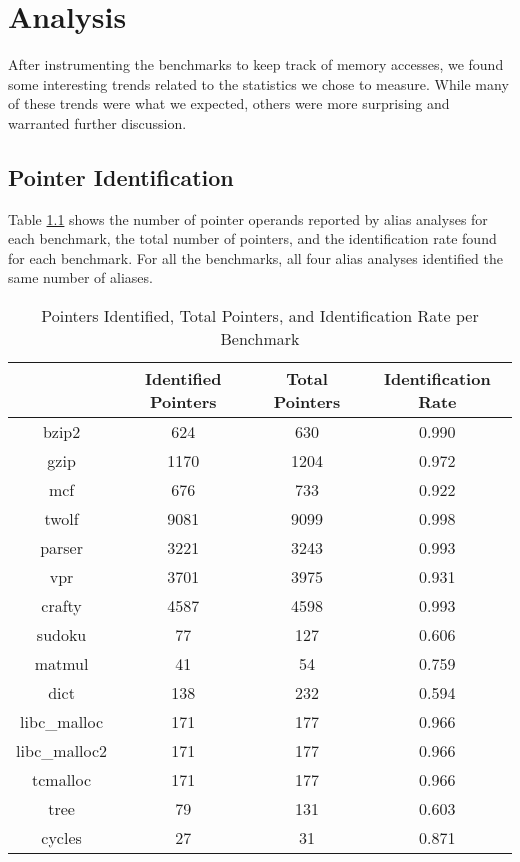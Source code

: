 \chapter{Analysis}

After instrumenting the benchmarks to keep track of memory accesses, we found some interesting trends related to the statistics we chose to measure. While many of these trends were what we expected, others were more surprising and warranted further discussion.

\section{Pointer Identification}
Table \ref{table:1} shows the number of pointer operands reported by alias analyses for each benchmark, the total number of pointers, and the identification rate found for each benchmark. For all the benchmarks, all four alias analyses identified the same number of aliases.

\begin{table} [h!]
\centering
   \begin{tabular} {|c|c c c|}
      \hline
	   & Identified Pointers & Total Pointers & Identification Rate \\
      \hline
	   bzip2 & 624 & 630 & 0.990 \\
      \hline
	   gzip & 1170 & 1204 & 0.972 \\
      \hline
	   mcf & 676 & 733 & 0.922 \\
      \hline
	   twolf & 9081 & 9099 & 0.998 \\
      \hline
	   parser & 3221 & 3243 & 0.993 \\
      \hline
	   vpr & 3701 & 3975 & 0.931 \\
      \hline
	   crafty & 4587 & 4598 & 0.993 \\
      \hline
	   sudoku & 77 & 127 & 0.606 \\
      \hline
	   matmul & 41 & 54 & 0.759 \\
      \hline
	   dict & 138 & 232 & 0.594 \\
      \hline
	   libc\_malloc & 171 & 177 & 0.966 \\
      \hline
	   libc\_malloc2 & 171 & 177 & 0.966 \\
      \hline
	   tcmalloc & 171 & 177 & 0.966 \\
      \hline
	   tree & 79 & 131 & 0.603 \\
      \hline
	   cycles & 27 & 31 & 0.871 \\
      \hline
   \end{tabular}
   \caption{Pointers Identified, Total Pointers, and Identification Rate per Benchmark}
   \label{table:1}
\end{table}

